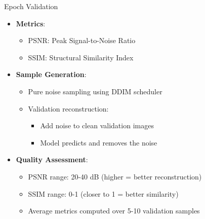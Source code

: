 \begin{frame}{Epoch Validation}
    \begin{itemize}
        \item \textbf{Metrics}:
              \begin{itemize}
                  \item PSNR: Peak Signal-to-Noise Ratio
                  \item SSIM: Structural Similarity Index
              \end{itemize}
        \item \textbf{Sample Generation}:
              \begin{itemize}
                  \item Pure noise sampling using DDIM scheduler
                  \item Validation reconstruction:
                        \begin{itemize}
                            \item Add noise to clean validation images
                            \item Model predicts and removes the noise
                        \end{itemize}
              \end{itemize}
        \item \textbf{Quality Assessment}:
              \begin{itemize}
                  \item PSNR range: 20-40 dB (higher = better reconstruction)
                  \item SSIM range: 0-1 (closer to 1 = better similarity)
                  \item Average metrics computed over 5-10 validation samples
              \end{itemize}
    \end{itemize}
\end{frame}
